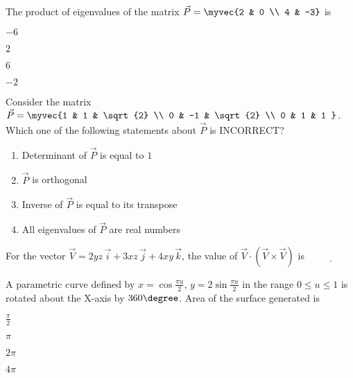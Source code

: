    \item The product of eigenvalues of the matrix $\vec{P} = \myvec{2 & 0 \\ 4 & -3}$ is
    \hfill{}
    \begin{enumerate}
        \begin{multicols}{4}
            \item $-6$
            \item $2$
            \item $6$
            \item $-2$
        \end{multicols}
    \end{enumerate}
    \item Consider the matrix $\vec{P} = \myvec{1 & 1 & \sqrt{2} \\ 0 & -1 & \sqrt{2} \\ 0 & 1 & 1 }$. Which one of the following statements about $\vec{P}$ is INCORRECT?
    \hfill{}
        \begin{multicols}{2}
    \begin{enumerate}
            \item Determinant of $\vec{P}$ is equal to $1$
            \item $\vec{P}$ is orthogonal
            \item Inverse of $\vec{P}$ is equal to its transpose
            \item All eigenvalues of $\vec{P}$ are real numbers
    \end{enumerate}
\end{multicols}
    \item For the vector $\vec{V} = 2yz\,\vec{i} + 3xz\,\vec{j} + 4xy\,\vec{k}$, the value of $\vec{V} \cdot (\vec{V} \times \vec{V})$ is $\underline{\hspace{2cm}}$

    \hfill{}
    \item A parametric curve defined by $x = \cos \frac{\pi u}{2},\,y = 2\sin\frac{\pi u}{2}$ in the range $0 \leq u \leq 1$ is rotated about the X-axis by $360\degree$. Area of the surface generated is
    \hfill{}
    \begin{enumerate}
        \begin{multicols}{4}
            \item $\frac{\pi}{2}$
            \item $\pi$
            \item $2\pi$
            \item $4\pi$
        \end{multicols}
    \end{enumerate}

